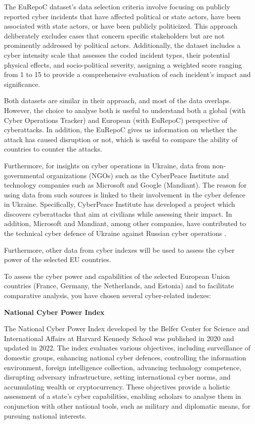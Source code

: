 The EuRepoC dataset's data selection criteria involve focusing on publicly reported cyber incidents that have affected political or state actors, have been associated with state actors, or have been publicly politicized. This approach deliberately excludes cases that concern specific stakeholders but are not prominently addressed by political actors. Additionally, the dataset includes a cyber intensity scale that assesses the coded incident types, their potential physical effects, and socio-political severity, assigning a weighted score ranging from 1 to 15 to provide a comprehensive evaluation of each incident's impact and significance.

Both datasets are similar in their approach, and most of the data overlaps. However, the choice to analyse both is useful to understand both a global (with Cyber Operations Tracker) and European (with EuRepoC) perspective of cyberattacks. In addition, the EuRepoC gives us information on whether the attack has caused disruption or not, which is useful to compare the ability of countries to counter the attacks. 

Furthermore, for insights on cyber operations in Ukraine, data from non-governmental organizations (NGOs) such as the CyberPeace Institute and technology companies such as Microsoft and Google (Mandiant). The reason for using data from such sources is linked to their involvement in the cyber defence in Ukraine. Specifically, CyberPeace Institute has developed a project which discovers cyberattacks that aim at civilians while assessing their impact. In addition, Microsoft and Mandiant, among other companies, have contributed to the technical cyber defence of Ukraine against Russian cyber operations \parencite{huntley_2023_fog, smith_2022_defending}.

Furthermore, other data from cyber indexes will be used to assess the cyber power of the selected EU countries. 




To assess the cyber power and capabilities of the selected European Union countries (France, Germany, the Netherlands, and Estonia) and to facilitate comparative analysis, you have chosen several cyber-related indexes:


\textbf{National Cyber Power Index}

The National Cyber Power Index developed by the Belfer Center for Science and International Affairs at Harvard Kennedy School was published in 2020 and updated in 2022. The index evaluates various objectives, including surveillance of domestic groups, enhancing national cyber defences, controlling the information environment, foreign intelligence collection, advancing technology competence, disrupting adversary infrastructure, setting international cyber norms, and accumulating wealth or cryptocurrency. These objectives provide a holistic assessment of a state's cyber capabilities, enabling scholars to analyse them in conjunction with other national tools, such as military and diplomatic means, for pursuing national interests. 

